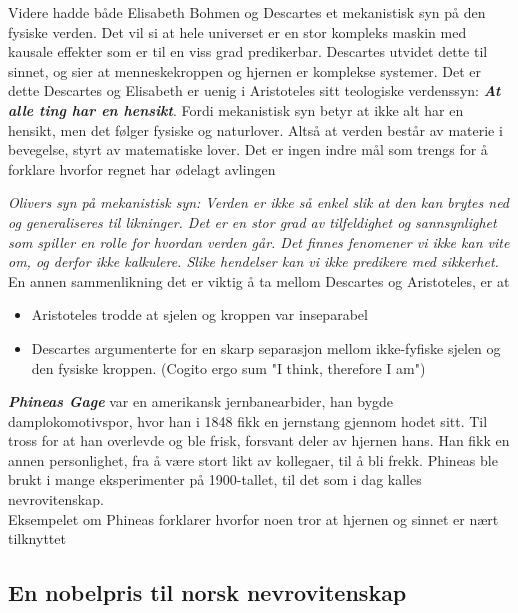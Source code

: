 \documentclass[11pt, a4paper]{article}
\begin{document}
Videre hadde både Elisabeth Bohmen og Descartes et mekanistisk syn på den fysiske verden. Det vil si at hele universet er en stor kompleks maskin med kausale effekter som er til en viss grad predikerbar. Descartes utvidet dette til sinnet, og sier at menneskekroppen og hjernen er komplekse systemer. Det er dette Descartes og Elisabeth er uenig i Aristoteles sitt teologiske verdenssyn: \textbf{\textit{At alle ting har en hensikt}}. Fordi mekanistisk syn betyr at ikke alt har en hensikt, men det følger fysiske og naturlover. Altså at verden består av materie i bevegelse, styrt av matematiske lover. Det er ingen indre mål som trengs for å forklare hvorfor regnet har ødelagt avlingen

\textit{Olivers syn på mekanistisk syn: Verden er ikke så enkel slik at den kan brytes ned og generaliseres til likninger. Det er en stor grad av tilfeldighet og sannsynlighet som spiller en rolle for hvordan verden går. Det finnes fenomener vi ikke kan vite om, og derfor ikke kalkulere. Slike hendelser kan vi ikke predikere med sikkerhet.}\\

En annen sammenlikning det er viktig å ta mellom Descartes og Aristoteles, er at

\begin{itemize}
    \item Aristoteles trodde at sjelen og kroppen var inseparabel
    \item Descartes argumenterte for en skarp separasjon mellom ikke-fyfiske sjelen og den fysiske kroppen. (Cogito ergo sum "I think, therefore I am")
\end{itemize}





\textbf{\textit{Phineas Gage}} var en amerikansk jernbanearbider, han bygde damplokomotivspor, hvor han i 1848 fikk en jernstang gjennom hodet sitt. Til tross for at han overlevde og ble frisk, forsvant deler av hjernen hans. Han fikk en annen personlighet, fra å være stort likt av kollegaer, til å bli frekk. Phineas ble brukt i mange eksperimenter på 1900-tallet, til det som i dag kalles nevrovitenskap.\\

Eksempelet om Phineas forklarer hvorfor noen tror at hjernen og sinnet er nært tilknyttet\\

\subsection{En nobelpris til norsk nevrovitenskap}
\end{document}
